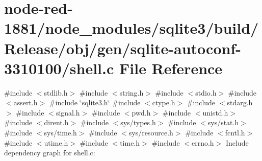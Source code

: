 \section{node-\/red-\/1881/node\+\_\+modules/sqlite3/build/\+Release/obj/gen/sqlite-\/autoconf-\/3310100/shell.c File Reference}
\label{shell_8c}
{\ttfamily \#include $<$stdlib.\+h$>$}\newline
{\ttfamily \#include $<$string.\+h$>$}\newline
{\ttfamily \#include $<$stdio.\+h$>$}\newline
{\ttfamily \#include $<$assert.\+h$>$}\newline
{\ttfamily \#include \char`\"{}sqlite3.\+h\char`\"{}}\newline
{\ttfamily \#include $<$ctype.\+h$>$}\newline
{\ttfamily \#include $<$stdarg.\+h$>$}\newline
{\ttfamily \#include $<$signal.\+h$>$}\newline
{\ttfamily \#include $<$pwd.\+h$>$}\newline
{\ttfamily \#include $<$unistd.\+h$>$}\newline
{\ttfamily \#include $<$dirent.\+h$>$}\newline
{\ttfamily \#include $<$sys/types.\+h$>$}\newline
{\ttfamily \#include $<$sys/stat.\+h$>$}\newline
{\ttfamily \#include $<$sys/time.\+h$>$}\newline
{\ttfamily \#include $<$sys/resource.\+h$>$}\newline
{\ttfamily \#include $<$fcntl.\+h$>$}\newline
{\ttfamily \#include $<$utime.\+h$>$}\newline
{\ttfamily \#include $<$time.\+h$>$}\newline
{\ttfamily \#include $<$errno.\+h$>$}\newline
Include dependency graph for shell.\+c\+:
